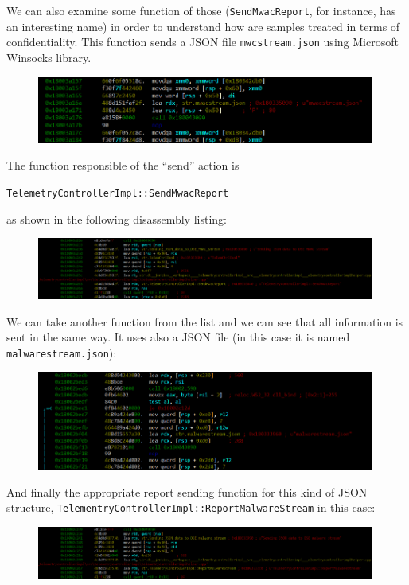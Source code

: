We can also examine some function of those (\texttt{SendMwacReport}, for
instance, has an interesting name) in order to understand how are samples
treated in terms of confidentiality. This function sends a JSON file
\texttt{mwcstream.json} using Microsoft Winsocks library.
\begin{figure}[h]
  \centering
  \includegraphics[width=0.99\textwidth]{./figures/mwcstream}
\end{figure}

The function responsible of the ``send'' action is
\begin{tcolorbox}
\texttt{TelemetryControllerImpl::SendMwacReport}
\end{tcolorbox}
as shown in the following disassembly listing:
 \begin{figure}[h]
  \centering
  \includegraphics[width=0.99\textwidth]{./figures/SendMwacReport}
\end{figure}

We can take another function from the list and we can see that all information
is sent in the same way. It uses also a JSON file (in this case it is named
\texttt{malwarestream.json}):
\begin{figure}[h]
  \centering
  \includegraphics[width=0.99\textwidth]{./figures/malwarestream}
\end{figure}

And finally the appropriate report sending function for this kind of JSON
structure, \texttt{TelementryControllerImpl::ReportMalwareStream} in this
case:
 \begin{figure}[h]
  \centering
  \includegraphics[width=0.99\textwidth]{./figures/ReportMalwareStream}
\end{figure}


